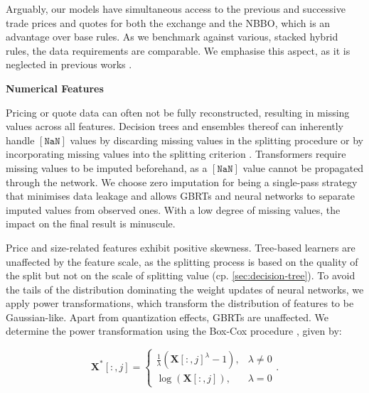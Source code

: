 Arguably, our models have simultaneous access to the previous and successive trade prices and quotes for both the exchange and the \gls{NBBO}, which is an advantage over base rules. As we benchmark against various, stacked hybrid rules, the data requirements are comparable. We emphasise this aspect, as it is neglected in previous works \autocites[][485]{blazejewskiLocalNonParametricModel2005}[][48]{ronenMachineLearningTrade2022}[][9]{rosenthalModelingTradeDirection2012}.

\textbf{Numerical Features}

Pricing or quote data can often not be fully reconstructed, resulting in missing values across all features. Decision trees and ensembles thereof can inherently handle $\mathtt{[NaN]}$ values by discarding missing values in the splitting procedure \autocite[][150--152]{breimanClassificationRegressionTrees2017} or by incorporating missing values into the splitting criterion \autocite[][951]{twalaGoodMethodsCoping2008}. Transformers require missing values to be imputed beforehand, as a $\mathtt{[NaN]}$ value cannot be propagated through the network. We choose zero imputation for being a single-pass strategy that minimises data leakage and allows \glspl{GBRT} and neural networks to separate imputed values from observed ones. With a low degree of missing values, the impact on the final result is minuscule.

Price and size-related features exhibit positive skewness. Tree-based learners are unaffected by the feature scale, as the splitting process is based on the quality of the split but not on the scale of splitting value (cp. \cref{sec:decision-tree}). To avoid the tails of the distribution dominating the weight updates of neural networks, we apply power transformations, which transform the distribution of features to be Gaussian-like. Apart from quantization effects, \glspl{GBRT} are unaffected. We determine the power transformation using the Box-Cox procedure \autocite[][214]{boxAnalysisTransformations2022}, given by:

\begin{equation}
    \mathbf{X}^{*}\left[:,j\right]= \begin{cases}\frac{1}{\lambda}(\mathbf{X}\left[:,j\right]^\lambda-1), & \lambda \neq 0 \\ \log (\mathbf{X}\left[:,j\right]),& \lambda=0\end{cases}.
    \label{eq:box-cox-test}
\end{equation}

